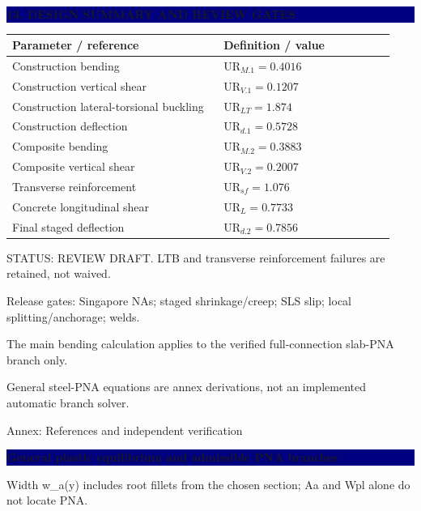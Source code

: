 \documentclass[a4paper,10pt]{article}
\newcommand{\sect}[1]{\Needspace{30mm}\vspace{10pt}\noindent\colorbox{navy}{\parbox{\dimexpr\linewidth-2\fboxsep}{\vspace{4pt}\color{white}\large\bfseries #1\vspace{4pt}}}\par\vspace{3pt}}
\begin{document}
\sect{13. DESIGN SUMMARY AND REVIEW GATES}
\Needspace{25mm}\begin{longtable}{@{}p{0.53\linewidth}p{0.43\linewidth}@{}}\rowcolor{light}\textbf{Parameter / reference} & \textbf{Definition / value}\\\midrule
{\small Construction bending} & {\small $\mathrm{UR}_{M.1}=0.4016$}\\[5pt]
{\small Construction vertical shear} & {\small $\mathrm{UR}_{V.1}=0.1207$}\\[5pt]
{\small Construction lateral-torsional buckling} & {\small $\mathrm{UR}_{LT}=1.874$}\\[5pt]
{\small Construction deflection} & {\small $\mathrm{UR}_{d.1}=0.5728$}\\[5pt]
{\small Composite bending} & {\small $\mathrm{UR}_{M.2}=0.3883$}\\[5pt]
{\small Composite vertical shear} & {\small $\mathrm{UR}_{V.2}=0.2007$}\\[5pt]
{\small Transverse reinforcement} & {\small $\mathrm{UR}_{sf}=1.076$}\\[5pt]
{\small Concrete longitudinal shear} & {\small $\mathrm{UR}_{L}=0.7733$}\\[5pt]
{\small Final staged deflection} & {\small $\mathrm{UR}_{d.2}=0.7856$}\\[5pt]\bottomrule\end{longtable}
{\small\color{muted}STATUS: REVIEW DRAFT. LTB and transverse reinforcement failures are retained, not waived.}\par
{\small\color{muted}Release gates: Singapore NAs; staged shrinkage/creep; SLS slip; local splitting/anchorage; welds.}\par
{\small\color{muted}The main bending calculation applies to the verified full-connection slab-PNA branch only.}\par
{\small\color{muted}General steel-PNA equations are annex derivations, not an implemented automatic branch solver.}\par
{\small\color{navy}Annex: References and independent verification}\par
\clearpage
\Needspace{22mm}\par
\sect{General plastic equilibrium and admissible PNA branches}
\Needspace{22mm}\par
{\small\color{muted}Width w\_a(y) includes root fillets from the chosen section; Aa and Wpl alone do not locate PNA.}\par
\end{document}
